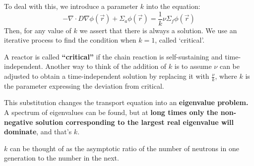 \documentclass[12pt]{article}
\begin{document}
To deal with this, we introduce a parameter $k$ into the equation:
%
\begin{equation}
-\nabla \cdot D\nabla \phi(\vec{r}) + 
\Sigma_a \phi(\vec{r}) = \frac{1}{k}\nu \Sigma_f \phi(\vec{r})
\end{equation}
%
Then, for any value of $k$ we assert that there is always a solution. We use an iterative process to find the condition when $k=1$, called `critical'.

A reactor is called \textbf{``critical''} if the chain reaction is self-sustaining and time-independent. Another way to think of the addition of $k$ is to assume $\nu$ can be adjusted to obtain a time-independent solution by replacing it with $\frac{\nu}{k}$, where $k$ is the parameter expressing the deviation from critical. 

This substitution changes the transport equation into an \textbf{eigenvalue problem.} A spectrum of eigenvalues can be found, but at \textbf{long times only the non-negative solution corresponding to the largest real eigenvalue will dominate}, and that's $k$. 

$k$ can be thought of as the asymptotic ratio of the number of neutrons in one generation to the number in the next.
\end{document}
